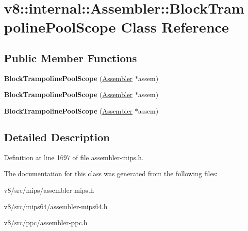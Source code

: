 \hypertarget{classv8_1_1internal_1_1Assembler_1_1BlockTrampolinePoolScope}{}\section{v8\+:\+:internal\+:\+:Assembler\+:\+:Block\+Trampoline\+Pool\+Scope Class Reference}
\label{classv8_1_1internal_1_1Assembler_1_1BlockTrampolinePoolScope}
\subsection*{Public Member Functions}
\begin{DoxyCompactItemize}
\item 
\mbox{\label{classv8_1_1internal_1_1Assembler_1_1BlockTrampolinePoolScope_aa8cbe59b88737d851c985765fa49455f}} 
{\bfseries Block\+Trampoline\+Pool\+Scope} (\mbox{\hyperlink{classv8_1_1internal_1_1Assembler}{Assembler}} $\ast$assem)
\item 
\mbox{\label{classv8_1_1internal_1_1Assembler_1_1BlockTrampolinePoolScope_aa8cbe59b88737d851c985765fa49455f}} 
{\bfseries Block\+Trampoline\+Pool\+Scope} (\mbox{\hyperlink{classv8_1_1internal_1_1Assembler}{Assembler}} $\ast$assem)
\item 
\mbox{\label{classv8_1_1internal_1_1Assembler_1_1BlockTrampolinePoolScope_aa8cbe59b88737d851c985765fa49455f}} 
{\bfseries Block\+Trampoline\+Pool\+Scope} (\mbox{\hyperlink{classv8_1_1internal_1_1Assembler}{Assembler}} $\ast$assem)
\end{DoxyCompactItemize}


\subsection{Detailed Description}


Definition at line 1697 of file assembler-\/mips.\+h.



The documentation for this class was generated from the following files\+:\begin{DoxyCompactItemize}
\item 
v8/src/mips/assembler-\/mips.\+h\item 
v8/src/mips64/assembler-\/mips64.\+h\item 
v8/src/ppc/assembler-\/ppc.\+h\end{DoxyCompactItemize}
